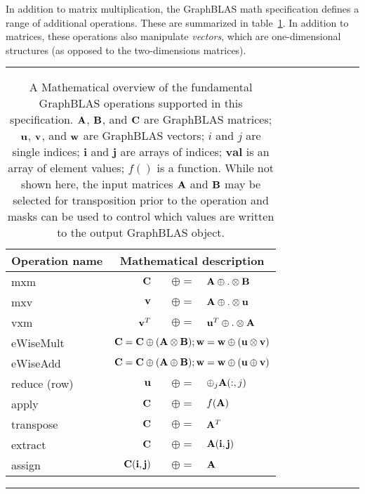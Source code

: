 In addition to matrix multiplication, the GraphBLAS math specification defines
a range of additional operations.  These are summarized in table~\ref{Tab:GraphBLASOps}.
In addition to matrices, these operations also manipulate \emph{vectors}, which are
one-dimensional structures (as opposed to the two-dimensions matrices).

\begin{table}[h]
\hrule
\begin{center}
\caption{A Mathematical overview of the fundamental GraphBLAS operations supported
in this specification. ${\bf A}$, ${\bf B}$, and ${\bf C}$ are GraphBLAS matrices; 
${\bf u}$, ${\bf v}$, and ${\bf w}$ are GraphBLAS vectors; $i$ and $j$ are single indices;
$\mathbf{i}$ and $\mathbf{j}$ are arrays of indices;
$\mathbf{val}$ is an array of element values;  $f()$ is a function.
While not shown here, the input 
matrices ${\bf A}$ and ${\bf B}$ may be selected for transposition prior to 
the operation and masks can be used to control which values are written to the output GraphBLAS object.}
\label{Tab:GraphBLASOps}
\begin{tabular}{l|rrl}
{\sf Operation name} & \multicolumn{3}{c}{Mathematical description}  \\
\hline
{\sf mxm}          & ${\bf C}$ & $\oplus=$ & ${\bf A} \oplus.\otimes {\bf B}$  \\
{\sf mxv}          & ${\bf v}$ & $\oplus=$ & ${\bf A} \oplus.\otimes {\bf u}$  \\
{\sf vxm}          & ${\bf v}^T$ & $\oplus=$ & ${\bf u}^T \oplus.\otimes {\bf A}$  \\
{\sf eWiseMult}    & \multicolumn{3}{c}{${\bf C} = {\bf C} \oplus ({\bf A} \otimes {\bf B}) ; {\bf w} = {\bf w} \oplus ({\bf u} \otimes {\bf v})$} \\
{\sf eWiseAdd}     & \multicolumn{3}{c}{${\bf C} = {\bf C} \oplus ({\bf A} \oplus {\bf B}) ; {\bf w} = {\bf w} \oplus ({\bf u} \oplus {\bf v})$} \\
{\sf reduce} (row) & ${\bf u}$ & $\oplus=$ & $\oplus_j{\bf A}(:,j)$  \\
{\sf apply}        & ${\bf C}$ & $\oplus=$ & $f({\bf A})$ \\
{\sf transpose}    & ${\bf C}$ & $\oplus=$ & ${\bf A}^T$ \\
{\sf extract}      & ${\bf C}$ & $\oplus=$ & ${\bf A}({\bf i},{\bf j})$ \\
{\sf assign}       & ${\bf C}({\bf i},{\bf j})$ & $\oplus=$ & ${\bf A}$ \\
\end{tabular}
\end{center}
\hrule
\end{table}

